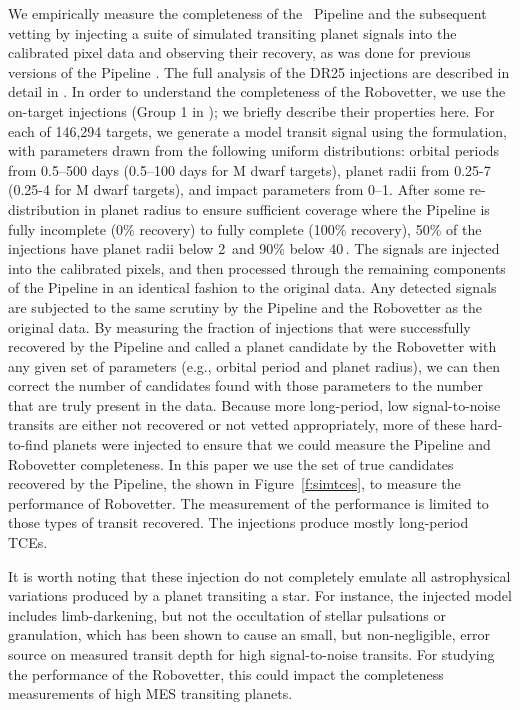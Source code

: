 We empirically measure the completeness of the \Kepler\ Pipeline and the subsequent vetting by injecting a suite of simulated transiting planet signals into the calibrated pixel data and observing their recovery, as was done for previous versions of the \Kepler{} Pipeline \citep{Christiansen2013a,Christiansen2015,Christiansen2016}. The full analysis of the DR25 injections are described in detail in \citet{Christiansen2017}. In order to understand the completeness of the Robovetter, we use the on-target injections (Group 1 in \citet{Christiansen2017}); we briefly describe their properties here. For each of 146,294 targets, we generate a model transit signal using the \citet{Mandel2002} formulation, with parameters drawn from the following uniform distributions: orbital periods from 0.5--500 days (0.5--100 days for M dwarf targets), planet radii from 0.25-7 \re{} (0.25-4 \re{} for M dwarf targets), and impact parameters from 0--1. After some re-distribution in planet radius to ensure sufficient coverage where the \Kepler{}Pipeline is fully incomplete (0\% recovery) to fully complete (100\% recovery), 50\% of the injections have planet radii below 2\,\re{} and 90\% below 40\,\re{}. The signals are injected into the calibrated pixels, and then processed through the remaining components of the \Kepler{} Pipeline in an identical fashion to the original data. Any detected signals are subjected to the same scrutiny by the Pipeline and the Robovetter as the original data. By measuring the fraction of injections that were successfully recovered by the Pipeline and called a planet candidate by the Robovetter with any given set of parameters (e.g., orbital period and planet radius), we can then correct the number of candidates found with those parameters to the number that are truly present in the data. Because more long-period, low signal-to-noise transits are either not recovered or not vetted appropriately, more of these hard-to-find planets were injected to ensure that we could measure the Pipeline and Robovetter completeness.  In this paper we use the set of true candidates recovered by the \Kepler{} Pipeline, the  shown in Figure~\ref{f:simtces}, to measure the performance of Robovetter. The measurement of the performance is limited to those types of transit recovered. The injections produce mostly long-period TCEs. 

{\color{blue}It is worth noting that these injection do not completely emulate all astrophysical variations produced by a planet transiting a star.  For instance, the injected model includes limb-darkening, but not the occultation of stellar pulsations or granulation, which has been shown to cause an small, but non-negligible, error source on measured transit depth \citep{Chiavassa2017} for high signal-to-noise transits.  For studying the performance of the Robovetter, this could impact the completeness measurements of high MES transiting planets. }


